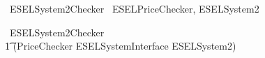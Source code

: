 \begin{zsection}
	\SECTION\ ESELSystem2Checker \parents\ ESELPriceChecker, ESELSystem2
\end{zsection}

\begin{circus}
    \circprocess\ ESELSystem2Checker \circdef \\
        \t1 (PriceChecker \lpar ESELSystemInterface \rpar ESELSystem2) \\
\end{circus}
